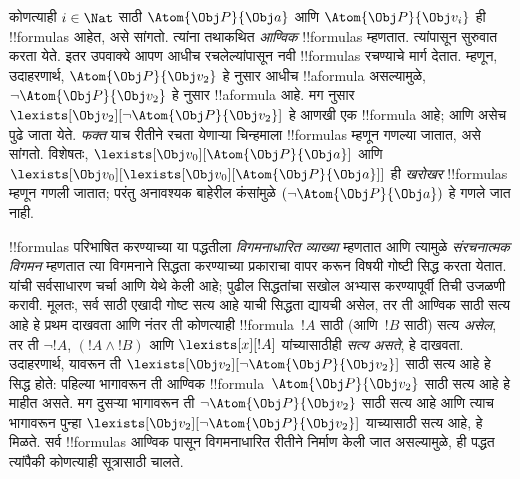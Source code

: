 \documentclass[../../../include/open-logic-section]{subfiles}
\begin{document}
कोणत्याही $i \in \Nat$ साठी $\Atom{\Obj P}{\Obj a}$ आणि
$\Atom{\Obj P}{\Obj v_i}$ ही !!{formula}s आहेत, असे
 सांगतो. त्यांना तथाकथित \emph{आण्विक} !!{formula}s
म्हणतात. त्यांपासून सुरुवात करता येते. इतर उपवाक्ये आपण आधीच
रचलेल्यांपासून नवी !!{formula}s रचण्याचे मार्ग देतात. म्हणून,
उदाहरणार्थ, $\Atom{\Obj P}{\Obj v_2}$ हे  नुसार आधीच
!!a{formula} असल्यामुळे, $\lnot \Atom{\Obj P}{\Obj v_2}$ हे
 नुसार !!a{formula} आहे. मग
 नुसार $\lexists[\Obj v_2][\lnot \Atom{\Obj P}{\Obj
v_2}]$ हे आणखी एक !!{formula} आहे; आणि असेच पुढे जाता येते. \emph{फक्त} याच
रीतीने रचता येणाऱ्या चिन्हमाला !!{formula}s म्हणून गणल्या जातात, असे
 सांगतो. विशेषतः,
$\lexists[\Obj v_0][\Atom{\Obj P}{\Obj a}]$ आणि $\lexists[\Obj
  v_0][\lexists[\Obj v_0][\Atom{\Obj P}{\Obj a}]]$ ही
\emph{खरोखर} !!{formula}s म्हणून गणली जातात; परंतु अनावश्यक बाहेरील
कंसांमुळे $(\lnot \Atom{\Obj P}{\Obj a})$ हे गणले जात नाही.

!!{formula}s परिभाषित करण्याच्या या पद्धतीला \emph{विगमनाधारित
व्याख्या} म्हणतात आणि त्यामुळे \emph{संरचनात्मक विगमन} म्हणतात त्या
विगमनाने सिद्धता करण्याच्या प्रकाराचा वापर करून विषयी
गोष्टी सिद्ध करता येतात. यांची सर्वसाधारण चर्चा
 आणि  येथे केली
आहे; पुढील सिद्धतांचा सखोल अभ्यास करण्यापूर्वी तिची उजळणी करावी. मूलतः,
सर्व साठी एखादी गोष्ट सत्य आहे याची सिद्धता द्यायची असेल,
तर ती आण्विक साठी सत्य आहे हे प्रथम दाखवता आणि नंतर ती
कोणत्याही !!{formula}~$!A$ साठी (आणि~$!B$ साठी) सत्य \emph{असेल}, तर
ती $\lnot !A$, $(!A \land !B)$ आणि $\lexists[x][!A]$ यांच्यासाठीही
\emph{सत्य असते}, हे दाखवता. उदाहरणार्थ, यावरून ती
$\lexists[\Obj v_2][\lnot \Atom{\Obj P}{\Obj v_2}]$ साठी सत्य आहे हे
सिद्ध होते: पहिल्या भागावरून ती आण्विक !!{formula}~$\Atom{\Obj
P}{\Obj v_2}$ साठी सत्य आहे हे माहीत असते. मग दुसऱ्या भागावरून ती
$\lnot \Atom{\Obj P}{\Obj v_2}$ साठी सत्य आहे आणि त्याच भागावरून पुन्हा
$\lexists[\Obj v_2][\lnot \Atom{\Obj P}{\Obj v_2}]$ याच्यासाठी सत्य
आहे, हे मिळते. सर्व !!{formula}s आण्विक पासून
विगमनाधारित रीतीने निर्माण केली जात असल्यामुळे, ही पद्धत त्यांपैकी
कोणत्याही सूत्रासाठी चालते.
\end{document}
